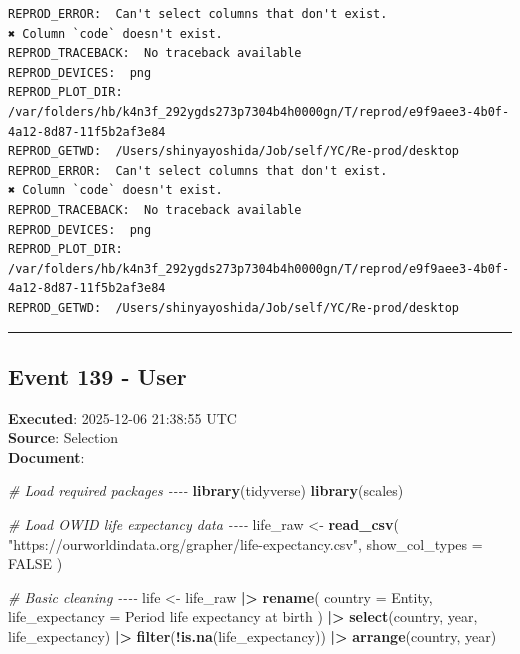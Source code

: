 \documentclass[
  11pt,
]{article}
\newenvironment{Shaded}{\begin{snugshade}}{\end{snugshade}}
\newcommand{\AttributeTok}[1]{\textcolor[rgb]{0.13,0.29,0.53}{#1}}
\newcommand{\CommentTok}[1]{\textcolor[rgb]{0.56,0.35,0.01}{\textit{#1}}}
\newcommand{\ConstantTok}[1]{\textcolor[rgb]{0.56,0.35,0.01}{#1}}
\newcommand{\FunctionTok}[1]{\textcolor[rgb]{0.13,0.29,0.53}{\textbf{#1}}}
\newcommand{\NormalTok}[1]{#1}
\newcommand{\OtherTok}[1]{\textcolor[rgb]{0.56,0.35,0.01}{#1}}
\newcommand{\SpecialCharTok}[1]{\textcolor[rgb]{0.81,0.36,0.00}{\textbf{#1}}}
\newcommand{\StringTok}[1]{\textcolor[rgb]{0.31,0.60,0.02}{#1}}
\newenvironment{rpoutput}{\vspace{0.5em}\begin{snugshade}}{\end{snugshade}}
\begin{document}
\begin{rpoutput}

\begin{verbatim}
REPROD_ERROR:  Can't select columns that don't exist.
✖ Column `code` doesn't exist. 
REPROD_TRACEBACK:  No traceback available  
REPROD_DEVICES:  png 
REPROD_PLOT_DIR:  /var/folders/hb/k4n3f_292ygds273p7304b4h0000gn/T/reprod/e9f9aee3-4b0f-4a12-8d87-11f5b2af3e84 
REPROD_GETWD:  /Users/shinyayoshida/Job/self/YC/Re-prod/desktop 
REPROD_ERROR:  Can't select columns that don't exist.
✖ Column `code` doesn't exist. 
REPROD_TRACEBACK:  No traceback available  
REPROD_DEVICES:  png 
REPROD_PLOT_DIR:  /var/folders/hb/k4n3f_292ygds273p7304b4h0000gn/T/reprod/e9f9aee3-4b0f-4a12-8d87-11f5b2af3e84 
REPROD_GETWD:  /Users/shinyayoshida/Job/self/YC/Re-prod/desktop 
\end{verbatim}

\end{rpoutput}

\begin{center}\rule{0.5\linewidth}{0.5pt}\end{center}

\subsection{Event 139 - User}\label{event-139---user}

\textbf{Executed}: 2025-12-06 21:38:55 UTC\\
\textbf{Source}: Selection\\
\textbf{Document}:

\begin{Shaded}
\begin{Highlighting}[]
\CommentTok{\# Load required packages {-}{-}{-}{-}}
\FunctionTok{library}\NormalTok{(tidyverse)}
\FunctionTok{library}\NormalTok{(scales)}

\CommentTok{\# Load OWID life expectancy data {-}{-}{-}{-}}
\NormalTok{life\_raw }\OtherTok{\textless{}{-}} \FunctionTok{read\_csv}\NormalTok{(}
  \StringTok{"https://ourworldindata.org/grapher/life{-}expectancy.csv"}\NormalTok{,}
  \AttributeTok{show\_col\_types =} \ConstantTok{FALSE}
\NormalTok{)}

\CommentTok{\# Basic cleaning {-}{-}{-}{-}}
\NormalTok{life }\OtherTok{\textless{}{-}}\NormalTok{ life\_raw }\SpecialCharTok{|\textgreater{}}
  \FunctionTok{rename}\NormalTok{(}
    \AttributeTok{country =}\NormalTok{ Entity,}
    \AttributeTok{life\_expectancy =} \StringTok{\textasciigrave{}}\AttributeTok{Period life expectancy at birth}\StringTok{\textasciigrave{}}
\NormalTok{  ) }\SpecialCharTok{|\textgreater{}}
  \FunctionTok{select}\NormalTok{(country, year, life\_expectancy) }\SpecialCharTok{|\textgreater{}}
  \FunctionTok{filter}\NormalTok{(}\SpecialCharTok{!}\FunctionTok{is.na}\NormalTok{(life\_expectancy)) }\SpecialCharTok{|\textgreater{}}
  \FunctionTok{arrange}\NormalTok{(country, year)}
\end{Highlighting}
\end{Shaded}
\end{document}
